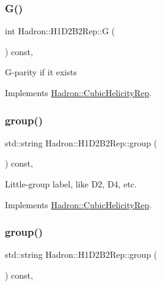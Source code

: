 \subsubsection{\texorpdfstring{G()}{G()}\hspace{0.1cm}{\footnotesize\ttfamily [3/3]}}
{\footnotesize\ttfamily int Hadron\+::\+H1\+D2\+B2\+Rep\+::G (\begin{DoxyParamCaption}{ }\end{DoxyParamCaption}) const\hspace{0.3cm}{\ttfamily [inline]}, {\ttfamily [virtual]}}

G-\/parity if it exists 

Implements \mbox{\hyperlink{structHadron_1_1CubicHelicityRep_a50689f42be1e6170aa8cf6ad0597018b}{Hadron\+::\+Cubic\+Helicity\+Rep}}.

\mbox{\label{structHadron_1_1H1D2B2Rep_ab0fa365d2ca739de8c62328e3e053deb}} 
\subsubsection{\texorpdfstring{group()}{group()}\hspace{0.1cm}{\footnotesize\ttfamily [1/5]}}
{\footnotesize\ttfamily std\+::string Hadron\+::\+H1\+D2\+B2\+Rep\+::group (\begin{DoxyParamCaption}{ }\end{DoxyParamCaption}) const\hspace{0.3cm}{\ttfamily [inline]}, {\ttfamily [virtual]}}

Little-\/group label, like D2, D4, etc. 

Implements \mbox{\hyperlink{structHadron_1_1CubicHelicityRep_a101a7d76cd8ccdad0f272db44b766113}{Hadron\+::\+Cubic\+Helicity\+Rep}}.

\mbox{\label{structHadron_1_1H1D2B2Rep_ab0fa365d2ca739de8c62328e3e053deb}} 
\subsubsection{\texorpdfstring{group()}{group()}\hspace{0.1cm}{\footnotesize\ttfamily [2/5]}}
{\footnotesize\ttfamily std\+::string Hadron\+::\+H1\+D2\+B2\+Rep\+::group (\begin{DoxyParamCaption}{ }\end{DoxyParamCaption}) const\hspace{0.3cm}{\ttfamily [inline]}, {\ttfamily [virtual]}}

